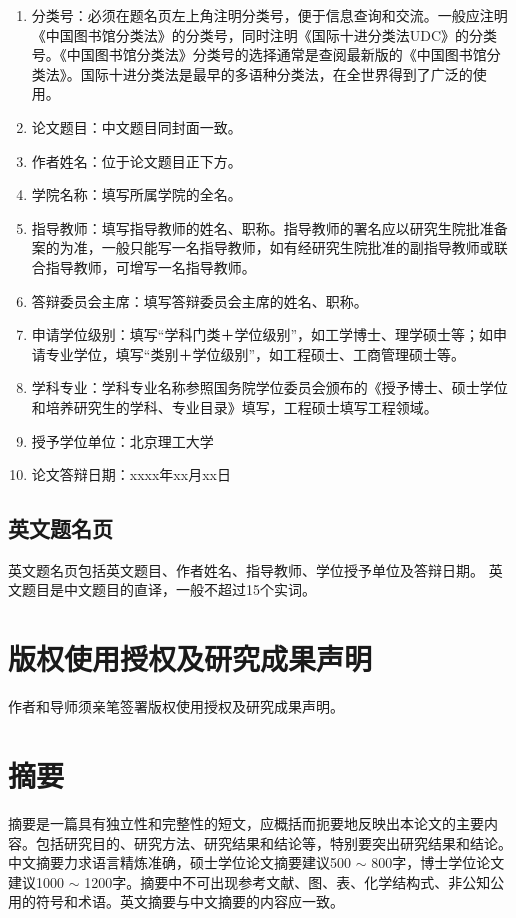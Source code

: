 \begin{enumerate}
\item 分类号：必须在题名页左上角注明分类号，便于信息查询和交流。一般应注明《中国图书馆分类法》的分类号，同时注明《国际十进分类法UDC》的分类号。《中国图书馆分类法》分类号的选择通常是查阅最新版的《中国图书馆分类法》。国际十进分类法是最早的多语种分类法，在全世界得到了广泛的使用。
\item 论文题目：中文题目同封面一致。
\item 作者姓名：位于论文题目正下方。
\item 学院名称：填写所属学院的全名。
\item 指导教师：填写指导教师的姓名、职称。指导教师的署名应以研究生院批准备案的为准，一般只能写一名指导教师，如有经研究生院批准的副指导教师或联合指导教师，可增写一名指导教师。
\item 答辩委员会主席：填写答辩委员会主席的姓名、职称。
\item 申请学位级别：填写“学科门类＋学位级别”，如工学博士、理学硕士等；如申请专业学位，填写“类别＋学位级别”，如工程硕士、工商管理硕士等。
\item 学科专业：学科专业名称参照国务院学位委员会颁布的《授予博士、硕士学位和培养研究生的学科、专业目录》填写，工程硕士填写工程领域。
\item 授予学位单位：北京理工大学
\item 论文答辩日期：xxxx年xx月xx日
\end{enumerate}

\subsection{英文题名页}
英文题名页包括英文题目、作者姓名、指导教师、学位授予单位及答辩日期。
英文题目是中文题目的直译，一般不超过15个实词。

\section{版权使用授权及研究成果声明}
作者和导师须亲笔签署版权使用授权及研究成果声明。

\section{摘要}
摘要是一篇具有独立性和完整性的短文，应概括而扼要地反映出本论文的主要内容。包括研究目的、研究方法、研究结果和结论等，特别要突出研究结果和结论。中文摘要力求语言精炼准确，硕士学位论文摘要建议500 $\sim$ 800字，博士学位论文建议1000 $\sim$ 1200字。摘要中不可出现参考文献、图、表、化学结构式、非公知公用的符号和术语。英文摘要与中文摘要的内容应一致。

